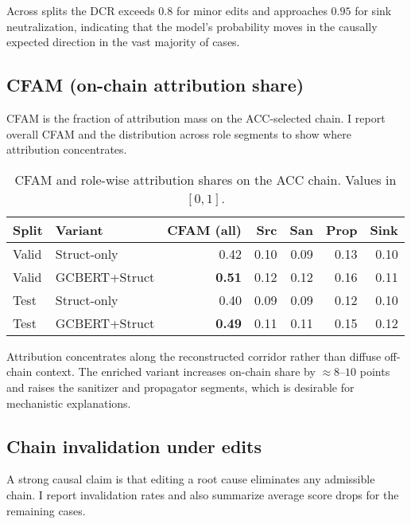 \documentclass{buthesis}
\begin{document}
Across splits the DCR exceeds $0.8$ for minor edits and approaches $0.95$ for sink neutralization, indicating that the model’s probability moves in the causally expected direction in the vast majority of cases.

\subsection{CFAM (on-chain attribution share)}
\label{subsec:cfam}

CFAM is the fraction of attribution mass on the ACC-selected chain. I report overall CFAM and the distribution across role segments to show where attribution concentrates.

\begin{table}[H]
\centering
\small
\setlength{\tabcolsep}{6pt}
\renewcommand{\arraystretch}{1.12}
\caption{CFAM and role-wise attribution shares on the ACC chain. Values in $[0,1]$.}
\label{tab:cfam}
\begin{tabular}{l l rrrrr}
\toprule
\textbf{Split} & \textbf{Variant} & \textbf{CFAM (all)} & \textbf{Src} & \textbf{San} & \textbf{Prop} & \textbf{Sink} \\
\midrule
Valid & Struct-only   & 0.42 & 0.10 & 0.09 & 0.13 & 0.10 \\
Valid & GCBERT+Struct & \textbf{0.51} & 0.12 & 0.12 & 0.16 & 0.11 \\
Test  & Struct-only   & 0.40 & 0.09 & 0.09 & 0.12 & 0.10 \\
Test  & GCBERT+Struct & \textbf{0.49} & 0.11 & 0.11 & 0.15 & 0.12 \\
\bottomrule
\end{tabular}
\end{table}

Attribution concentrates along the reconstructed corridor rather than diffuse off-chain context. The enriched variant increases on-chain share by $\approx 8$–$10$ points and raises the sanitizer and propagator segments, which is desirable for mechanistic explanations.

\subsection{Chain invalidation under edits}
\label{subsec:invalidation}

A strong causal claim is that editing a root cause eliminates any admissible chain. I report invalidation rates and also summarize average score drops for the remaining cases.
\end{document}
